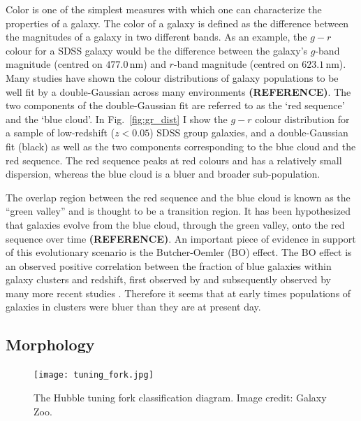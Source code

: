 Color is one of the simplest measures with which one can characterize
the properties of a galaxy.  The color of a galaxy is defined as the
difference between the magnitudes of a galaxy in two different bands.
As an example, the $g - r$ colour for a SDSS galaxy would be the
difference between the galaxy's $g$-band magnitude (centred on
$477.0\,\mathrm{nm}$) and $r$-band magnitude (centred on
$623.1\,\mathrm{nm}$).  Many studies have shown the colour
distributions of galaxy populations to be well fit by a
double-Gaussian across many environments \textbf{(REFERENCE)}.  The two
components of the double-Gaussian fit are referred to as the `red
sequence' and the `blue cloud'.  In Fig.~\ref{fig:gr_dist} I show the
$g-r$ colour distribution for a sample of low-redshift ($z < 0.05$)
SDSS group galaxies, and a double-Gaussian fit (black) as well as the
two components corresponding to the blue cloud and the red sequence.
The red sequence peaks at red colours and has a
relatively small dispersion, whereas the blue cloud is a bluer and
broader sub-population.
\par
The overlap region between the red sequence
and the blue cloud is known as the ``green valley'' and is thought to
be a transition region.  It has been hypothesized that galaxies evolve
from the blue cloud, through the green valley, onto the red sequence
over time \textbf{(REFERENCE)}.  An important piece of evidence in
support of
this evolutionary scenario is the Butcher-Oemler (BO) effect.  The BO
effect is an observed positive correlation between the fraction of blue
galaxies within galaxy clusters and redshift, first observed by
\citet{butcher1978} and subsequently observed by many more recent
studies \citep[e.g.][]{butcher1984, ellingson2001, loh2008,
  urquhart2010}.  Therefore it seems that at early times populations
of galaxies in clusters were bluer than they are at present day.    

\subsection{Morphology}
\label{sec:morph}

\begin{figure}[!ht]
  \centering
  \texttt{[image: tuning\_fork.jpg]}
  \caption{The Hubble tuning fork classification diagram.  Image
    credit: Galaxy Zoo.}
  \label{fig:tuning_fork}
\end{figure}

